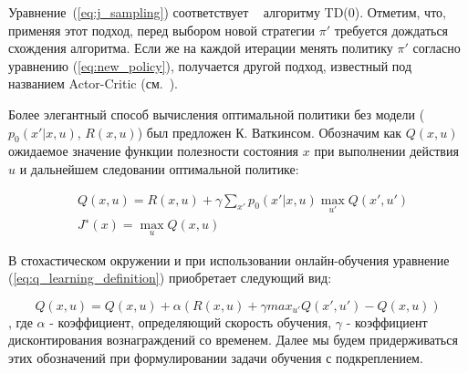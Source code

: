 Уравнение~(\ref{eq:j_sampling}) соответствует ~\cite{sutton1998reinforcement} алгоритму TD(0). Отметим, что, применяя этот подход, перед выбором новой стратегии $\pi'$ требуется дождаться схождения алгоритма. Если же на каждой итерации менять политику $\pi'$ согласно уравнению (\ref{eq:new_policy}), получается другой подход, известный под названием Actor-Critic (см.~\cite{actor_critic}).

Более элегантный способ вычисления оптимальной политики без модели ($p_0(x'|x,u)$, $R(x,u)$) был предложен \cite{Watkins:1989} К. Ваткинсом. Обозначим как $Q(x, u)$ ожидаемое значение функции полезности состояния $x$ при выполнении действия $u$ и дальнейшем следовании оптимальной политике:

\begin{equation}
    \label{eq:q_learning_definition}
    \begin{split}
      & Q(x, u) = R(x, u) + \gamma \sum_{x'} {
          p_0(x'|x, u) \max_{u'} Q(x', u')
       }
       \\
      & J^{∗}(x) = \max_{u} Q(x,u)
     \end{split}
\end{equation}

В стохастическом окружении и при использовании онлайн-обучения уравнение (\ref{eq:q_learning_definition}) приобретает следующий вид:

\begin{equation}
    \label{eq:q_learning_online_stochastic}
    Q(x, u) = Q(x, u) + \alpha(R(x, u) + \gamma max_{u'} Q(x', u') − Q(x, u))
\end{equation},
где $\alpha$ - коэффициент, определяющий скорость обучения, $\gamma$ - коэффициент дисконтирования вознаграждений со временем. Далее мы будем придерживаться этих обозначений при формулировании задачи обучения с подкреплением.



\cite{лаптев2011применение, Magnusson:2012:SCW:2351316.2351327, hung2006applying, nelson2008exploiting, arisholm2007data, nguyen2012timely}





